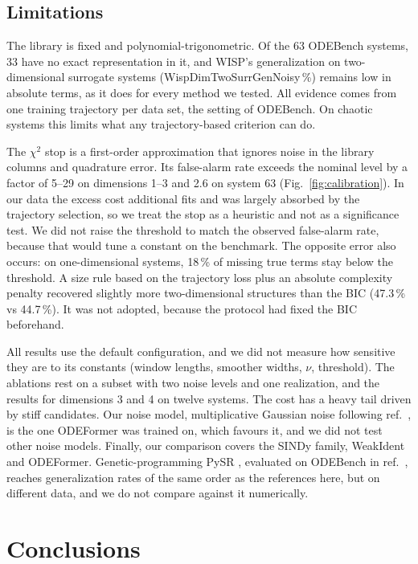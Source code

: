 \documentclass[10pt]{article}
\newcommand{\pv}[1]{\textcolor{prelim}{#1}}
\newcommand{\pv}[1]{#1}
\newcommand{\m}[1]{\pv{\csname #1\endcsname}}            %
\begin{document}
\subsection{Limitations}\label{sec:limitations}
The library is fixed and polynomial-trigonometric. Of the 63 ODEBench systems, 33 have no exact representation in it,
and WISP's generalization on two-dimensional surrogate systems (\m{WispDimTwoSurrGenNoisy}\,\%) remains low in absolute
terms, as it does for every method we tested. All evidence comes from one training trajectory per data set, the
setting of ODEBench. On chaotic systems this limits what any trajectory-based criterion can do.

The $\chi^2$ stop is a first-order approximation that ignores noise in the library columns and quadrature error. Its
false-alarm rate exceeds the nominal level by a factor of 5--29 on dimensions 1--3 and 2.6 on system 63
(Fig.~\ref{fig:calibration}). In our data the excess cost additional fits and was largely absorbed by the trajectory
selection, so we treat the stop as a heuristic and not as a significance test. We did not raise the threshold to match
the observed false-alarm rate, because that would tune a constant on the benchmark. The opposite error also occurs: on
one-dimensional systems, 18\,\% of missing true terms stay below the threshold. A size rule based on the trajectory
loss plus an absolute complexity penalty recovered slightly more two-dimensional structures than the BIC
(\pv{47.3}\,\% vs \pv{44.7}\,\%). It was not adopted, because the protocol had fixed the BIC beforehand.

All results use the default configuration, and we did not measure how sensitive they are to its constants (window
lengths, smoother widths, $\nu$, threshold). The ablations rest on a subset with two noise levels and one realization,
and the results for dimensions 3 and 4 on twelve systems. The cost has a heavy tail driven by stiff candidates. Our
noise model, multiplicative Gaussian noise following ref.~\cite{dascoli2024}, is the one ODEFormer was trained on,
which favours it, and we did not test other noise models. Finally, our comparison covers the SINDy family, WeakIdent and ODEFormer. Genetic-programming PySR
\cite{cranmer2023}, evaluated on ODEBench in ref.~\cite{dascoli2024}, reaches generalization rates of the same order as
the references here, but on different data, and we do not compare
against it numerically.

\section{Conclusions}\label{sec:conclusions}
\end{document}
